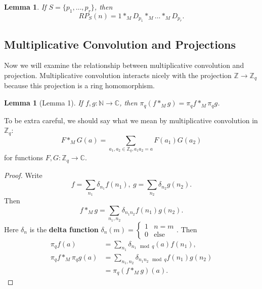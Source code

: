 \documentclass[12pt]{amsart}
\newtheorem{lemma}[theorem]{Lemma}
\begin{document}
\begin{lemma}
    If $S = \{ p_1, \ldots, p_r \}$, then
    \[
        RP_S(n) = 1 *_M D_{p_1} *_M \ldots *_M D_{p_r}.
    \]
\end{lemma}

\subsection{Multiplicative Convolution and Projections}
Now we will examine the relationship between multiplicative convolution and projection. Multiplicative convolution interacts nicely with the projection $\mathbb{Z} \to \mathbb{Z}_q$ because this projection is a ring homomorphism.

\begin{lemma}[Lemma 1]
    If $f, g : \mathbb{N} \to \mathbb{C}$, then $\pi_q(f *_M g) = \pi_q f *_M \pi_q g$.
\end{lemma}
To be extra careful, we should say what we mean by multiplicative convolution in $\mathbb{Z}_q$:
\[
    F *_M G(a) = \sum_{a_1, a_2 \in \mathbb{Z}_q, a_1 a_2 = a} F(a_1) G(a_2)
\]
for functions $F, G : \mathbb{Z}_q \to \mathbb{C}$.
\begin{proof}
    Write
    \[
        f = \sum_{n_1} \delta_{n_1} f(n_1), \ g = \sum_{n_2} \delta_{n_2} g(n_2).
    \]
    Then
    \[
        f *_M g = \sum_{n_1, n_2} \delta_{n_1n_2} f(n_1) g(n_2).
    \]
    Here $\delta_n$ is the \textbf{delta function} $\delta_n(m) = \begin{cases}
        1 & n = m \\
        0 & \text{else}
    \end{cases}$. Then
    \begin{align*}
        \pi_q f(a) & = \sum_{n_1} \delta_{n_1 \mod q}(a) f(n_1), \\
        \pi_q f *_M \pi_q g(a) & = \sum_{n_1, n_2} \delta_{n_1 n_2 \mod q} f(n_1) g(n_2) \\
        & = \pi_q(f *_M g)(a).
    \end{align*}
\end{proof}
\end{document}
